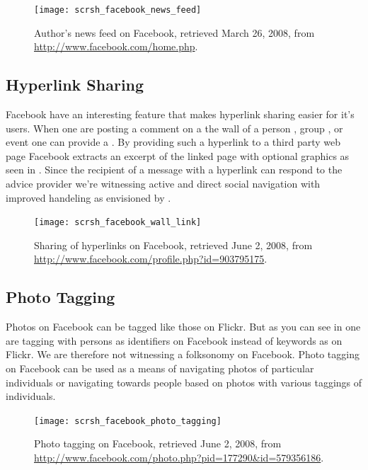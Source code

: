 \begin{figure}
  \texttt{[image: scrsh\_facebook\_news\_feed]}
  \caption[Facebook News Feed]{%
     Author's news feed on Facebook,
     retrieved March 26, 2008, from \url{http://www.facebook.com/home.php}.}
  \label{figure:scrsh.facebook.news.feed}
\end{figure}


\subsection{Hyperlink Sharing}

Facebook have an interesting feature that makes hyperlink sharing easier for
it's users. When one are posting a comment on a the wall of a person
,
group
,
or event
one can provide a . By providing such a hyperlink to a
third party web page Facebook extracts an excerpt of the linked page with
optional graphics as seen in . Since the
recipient of a message with a hyperlink can respond to the advice provider
we're witnessing active and direct social navigation with
improved  handeling as envisioned by
\citet[]{dieberger97}.

\begin{figure}
  \texttt{[image: scrsh\_facebook\_wall\_link]}
  \caption[Facebook Hyperlink Sharing]{%
     Sharing of hyperlinks on Facebook,
     retrieved June 2, 2008, from
     \url{http://www.facebook.com/profile.php?id=903795175}.}
  \label{figure:scrsh.facebook.wall.link}
\end{figure}

\subsection{Photo Tagging}

Photos on Facebook can be tagged  like those on Flickr.
But as you can see in  one are
tagging with persons as identifiers on Facebook instead of keywords as on
Flickr. We are
therefore not witnessing a folksonomy on Facebook. Photo tagging on Facebook
can be used as a means of navigating photos of particular individuals or
navigating towards people based on photos with various taggings of
individuals.

\begin{figure}
  \texttt{[image: scrsh\_facebook\_photo\_tagging]}
  \caption[Facebook Photo Tagging]{%
     Photo tagging on Facebook,
     retrieved June 2, 2008, from
     \url{http://www.facebook.com/photo.php?pid=177290&id=579356186}.}
  \label{figure:scrsh.facebook.photo.tagging}
\end{figure}
